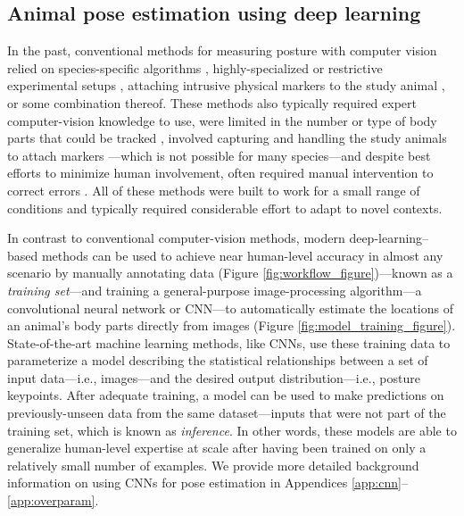 \documentclass[11pt,a4paper,twoside]{book}
\begin{document}
\begin{doublespace}
\subsection{Animal pose estimation using deep learning}
In the past, conventional methods for measuring posture with computer vision relied on species-specific algorithms \citep{uhlmann2017flylimbtracker}, highly-specialized or restrictive experimental setups \citep{mendes2013quantification, kain2013leg}, attaching intrusive physical markers to the study animal \citep{kain2013leg}, or some combination thereof. These methods also typically required expert computer-vision knowledge to use, were limited in the number or type of body parts that could be tracked \citep{mendes2013quantification}, involved capturing and handling the study animals to attach markers \citep{kain2013leg}---which is not possible for many species---and despite best efforts to minimize human involvement, often required manual intervention to correct errors \citep{uhlmann2017flylimbtracker}. All of these methods were built to work for a small range of conditions and typically required considerable effort to adapt to novel contexts.

In contrast to conventional computer-vision methods, modern deep-learning–based methods can be used to achieve near human-level accuracy in almost any scenario by manually annotating data (Figure \ref{fig:workflow_figure})—known as a \textit{training set}—and training a general-purpose image-processing algorithm—a convolutional neural network or CNN—to automatically estimate the locations of an animal's body parts directly from images (Figure \ref{fig:model_training_figure}). State-of-the-art machine learning methods, like CNNs, use these training data to parameterize a model describing the statistical relationships between a set of input data—i.e., images—and the desired output distribution—i.e., posture keypoints. After adequate training, a model can be used to make predictions on previously-unseen data from the same dataset—inputs that were not part of the training set, which is known as \textit{inference}. In other words, these models are able to generalize human-level expertise at scale after having been trained on only a relatively small number of examples. We provide more detailed background information on using CNNs for pose estimation in Appendices \ref{app:cnn}–\ref{app:overparam}.


\end{doublespace}
\end{document}
